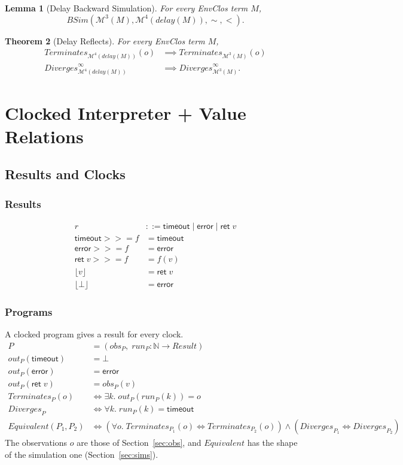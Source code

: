\documentclass[10pt]{article}
\theoremstyle{acmplain}
\newtheorem{theorem}{Theorem}[section]
\newtheorem{lemma}[theorem]{Lemma}
\newcommand{\key}[1]{\mathsf{#1}}
\newcommand{\pass}[1]{\mathit{#1}}
\newcommand{\error}{\key{error}}
\newcommand{\Mach}[1]{\mathcal{M}^{#1}}
\newcommand{\obs}{\mathit{obs}}
\newcommand{\Term}{\mathit{Terminates}}
\newcommand{\Div}{\mathit{Diverges}}
\newcommand{\Equiv}{\mathit{Equivalent}}
\newcommand{\BSim}{\mathit{BSim}}
\newcommand{\tmo}{\key{timeout}}
\newcommand{\Ret}{\key{ret}\;}
\newcommand{\bind}{\mathbin{>\!\!>\!\!=}}
\newcommand{\lift}[1]{\lfloor #1 \rfloor}
\newcommand{\run}{\mathit{run}}
\newcommand{\outc}{\mathit{out}}
\begin{document}
\begin{lemma}[Delay Backward Simulation]\label{lem:delay-bsim}
For every EnvClos term $M$,
\[
  \BSim(\Mach{3}(M), \Mach{4}(\pass{delay}(M)), \sim, <) .
\]
\end{lemma}

\begin{theorem}[Delay Reflects]\label{thm:delay-reflects}
For every EnvClos term $M$,
\begin{align*}
  \Term_{\Mach{4}(\pass{delay}(M))}(o) &\implies \Term_{\Mach{3}(M)}(o) \\
  \Div^\infty_{\Mach{4}(\pass{delay}(M))} &\implies \Div^\infty_{\Mach{3}(M)} .
\end{align*}
\end{theorem}

\section{Clocked Interpreter + Value Relations}\label{sec:u-interp}

\subsection{Results and Clocks}

\subsubsection{Results}

\begin{align*}
  r &::= \tmo \mid \error \mid \Ret v \\[1ex]
  \tmo \bind f &= \tmo \\
  \error \bind f &= \error \\
  \Ret v \bind f &= f(v) \\[1ex]
  \lift{v} &= \Ret v \\
  \lift{\bot} &= \error
\end{align*}

\subsubsection{Programs}

A clocked program gives a result for every clock.
\begin{align*}
  P &= (\obs_P,\; \run_P : \mathbb{N} \to \mathit{Result}) \\[1ex]
  \outc_P(\tmo) &= \bot \\
  \outc_P(\error) &= \error \\
  \outc_P(\Ret v) &= \obs_P(v) \\[1ex]
  \Term_P(o) &\iff \exists k.\; \outc_P(\run_P(k)) = o \\
  \Div_P &\iff \forall k.\; \run_P(k) = \tmo \\
  \Equiv(P_1, P_2) &\iff
    (\forall o.\; \Term_{P_1}(o) \iff \Term_{P_2}(o)) \land (\Div_{P_1} \iff \Div_{P_2})
\end{align*}
The observations $o$ are those of Section~\ref{sec:obs}, and $\Equiv$ has the
shape of the simulation one (Section~\ref{sec:sims}).
\end{document}
